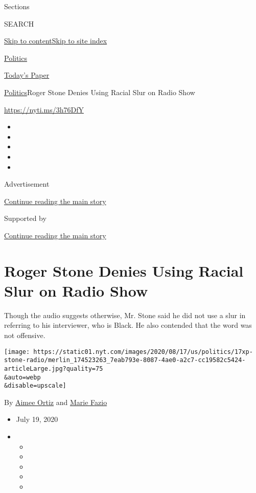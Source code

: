 Sections

SEARCH

\protect\hyperlink{site-content}{Skip to
content}\protect\hyperlink{site-index}{Skip to site index}

\href{https://www.nytimes.com/section/politics}{Politics}

\href{https://myaccount.nytimes.com/auth/login?response_type=cookie\&client_id=vi}{}

\href{https://www.nytimes.com/section/todayspaper}{Today's Paper}

\href{/section/politics}{Politics}\textbar{}Roger Stone Denies Using
Racial Slur on Radio Show

\url{https://nyti.ms/3h76DfY}

\begin{itemize}
\item
\item
\item
\item
\item
\end{itemize}

Advertisement

\protect\hyperlink{after-top}{Continue reading the main story}

Supported by

\protect\hyperlink{after-sponsor}{Continue reading the main story}

\hypertarget{roger-stone-denies-using-racial-slur-on-radio-show}{%
\section{Roger Stone Denies Using Racial Slur on Radio
Show}\label{roger-stone-denies-using-racial-slur-on-radio-show}}

Though the audio suggests otherwise, Mr. Stone said he did not use a
slur in referring to his interviewer, who is Black. He also contended
that the word was not offensive.

\texttt{[image: https://static01.nyt.com/images/2020/08/17/us/politics/17xp-stone-radio/merlin\_174523263\_7eab793e-8087-4ae0-a2c7-cc19582c5424-articleLarge.jpg?quality=75\\\&auto=webp\\\&disable=upscale]}

By \href{https://www.nytimes.com/by/aimee-ortiz}{Aimee Ortiz} and
\href{https://www.nytimes.com/by/marie-fazio}{Marie Fazio}

\begin{itemize}
\item
  July 19, 2020
\item
  \begin{itemize}
  \item
  \item
  \item
  \item
  \item
  \end{itemize}
\end{itemize}

